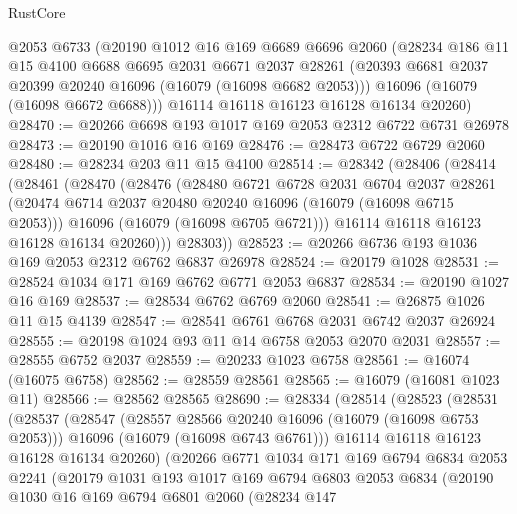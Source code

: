 \begin{lexlean}{RustCore}
\begin{coremodule}
    @2053
    @6733
    (@20190
      @1012
      @16
      @169
      @6689
      @6696
      @2060
      (@28234
        @186
        @11
        @15
        @4100
        @6688
        @6695
        @2031
        @6671
        @2037
        @28261
        (@20393 @6681 @2037 @20399 @20240 @16096 (@16079 (@16098 @6682 @2053)))
        @16096
        (@16079 (@16098 @6672 @6688)))
      @16114
      @16118
      @16123
      @16128
      @16134
      @20260)
@28470 := @20266 @6698 @193 @1017 @169 @2053 @2312 @6722 @6731 @26978
@28473 := @20190 @1016 @16 @169
@28476 := @28473 @6722 @6729 @2060
@28480 := @28234 @203 @11 @15 @4100
@28514 := @28342
    (@28406
      (@28414
        (@28461
          (@28470
            (@28476
              (@28480
                @6721
                @6728
                @2031
                @6704
                @2037
                @28261
                (@20474 @6714 @2037 @20480 @20240 @16096 (@16079 (@16098 @6715 @2053)))
                @16096
                (@16079 (@16098 @6705 @6721)))
              @16114
              @16118
              @16123
              @16128
              @16134
              @20260)))
        @28303))
@28523 := @20266 @6736 @193 @1036 @169 @2053 @2312 @6762 @6837 @26978
@28524 := @20179 @1028
@28531 := @28524 @1034 @171 @169 @6762 @6771 @2053 @6837
@28534 := @20190 @1027 @16 @169
@28537 := @28534 @6762 @6769 @2060
@28541 := @26875 @1026 @11 @15 @4139
@28547 := @28541 @6761 @6768 @2031 @6742 @2037 @26924
@28555 := @20198 @1024 @93 @11 @14 @6758 @2053 @2070 @2031
@28557 := @28555 @6752 @2037
@28559 := @20233 @1023 @6758
@28561 := @16074 (@16075 @6758)
@28562 := @28559 @28561
@28565 := @16079 (@16081 @1023 @11)
@28566 := @28562 @28565
@28690 := @28334
    (@28514
      (@28523
        (@28531
          (@28537
            (@28547
              (@28557 @28566 @20240 @16096 (@16079 (@16098 @6753 @2053)))
              @16096
              (@16079 (@16098 @6743 @6761)))
            @16114
            @16118
            @16123
            @16128
            @16134
            @20260)
          (@20266
            @6771
            @1034
            @171
            @169
            @6794
            @6834
            @2053
            @2241
            (@20179
              @1031
              @193
              @1017
              @169
              @6794
              @6803
              @2053
              @6834
              (@20190
                @1030
                @16
                @169
                @6794
                @6801
                @2060
                (@28234
                  @147

\end{coremodule}
\end{lexlean}
